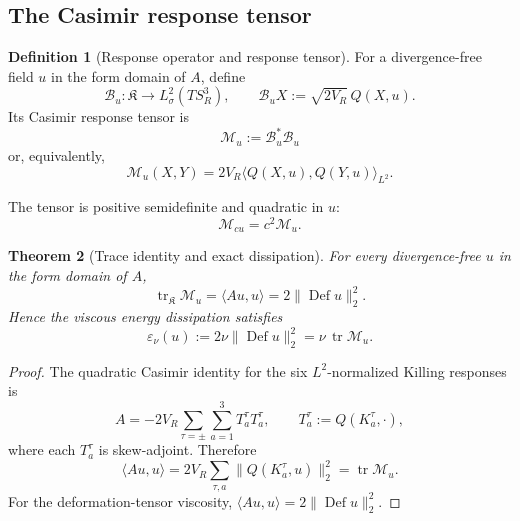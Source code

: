 \documentclass[
 aps,
 prd,
 reprint,
 amsmath,
 amssymb,
 nofootinbib,
 superscriptaddress
]{revtex4-2}
\newtheorem{theorem}{Theorem}[section]
\theoremstyle{definition}
\newtheorem{definition}[theorem]{Definition}
\theoremstyle{remark}
\newcommand{\Sthree}{S^3_R}
\newcommand{\cM}{\mathscr M}
\newcommand{\cB}{\mathscr B}
\newcommand{\Def}{\operatorname{Def}}
\newcommand{\tr}{\operatorname{tr}}
\begin{document}
\subsection{The Casimir response tensor}

\begin{definition}[Response operator and response tensor]
\label{R:rg:def:response}
For a divergence-free field $u$ in the form domain of $A$, define
\begin{equation}
 \cB_u:\mathfrak K\longrightarrow L^2_\sigma(T\Sthree),
 \qquad
 \cB_uX
 :=
 \sqrt{2V_R}\,Q(X,u).
 \label{R:rg:eq:Rdef}
\end{equation}
Its Casimir response tensor is
\begin{equation}
 \boxed{
 \cM_u
 :=
 \cB_u^*\cB_u
 }
 \label{R:rg:eq:Moperator}
\end{equation}
or, equivalently,
\begin{equation}
 \cM_u(X,Y)
 =
 2V_R
 \langle Q(X,u),Q(Y,u)\rangle_{L^2}.
 \label{R:rg:eq:Mform}
\end{equation}
\end{definition}

The tensor is positive semidefinite and quadratic in $u$:
\[
      \cM_{cu}=c^2\cM_u.
\]

\begin{theorem}[Trace identity and exact dissipation]
\label{R:rg:thm:trace}
For every divergence-free $u$ in the form domain of $A$,
\begin{equation}
 \boxed{
 \tr_{\mathfrak K}\cM_u
 =
 \langle Au,u\rangle
 =
 2\|\Def u\|_2^2.
 }
 \label{R:rg:eq:trace}
\end{equation}
Hence the viscous energy dissipation satisfies
\begin{equation}
 \boxed{
 \varepsilon_\nu(u)
 :=
 2\nu\|\Def u\|_2^2
 =
 \nu\,\tr\cM_u.
 }
 \label{R:rg:eq:diss}
\end{equation}
\end{theorem}

\begin{proof}
The quadratic Casimir identity for the six $L^2$-normalized Killing
responses is
\begin{equation}
 A
 =
 -2V_R
 \sum_{\tau=\pm}\sum_{a=1}^3
 T_a^\tau T_a^\tau,
 \qquad
 T_a^\tau:=Q(K_a^\tau,\cdot),
 \label{R:rg:eq:Acasimir}
\end{equation}
where each $T_a^\tau$ is skew-adjoint.  Therefore
\[
 \langle Au,u\rangle
 =
 2V_R
 \sum_{\tau,a}
 \|Q(K_a^\tau,u)\|_2^2
 =
 \tr\cM_u.
\]
For the deformation-tensor viscosity,
$\langle Au,u\rangle=2\|\Def u\|_2^2$.
\end{proof}
\end{document}

